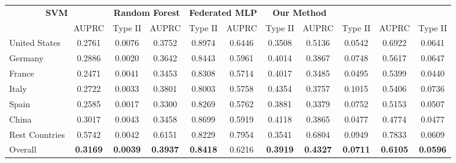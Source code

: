 \begin{table}[ht!]
{\begin{tabular}{l|cc|cc|cc|cc|cc}
\multicolumn{2}{c|}{\textbf{SVM}} &
\multicolumn{2}{c|}{\textbf{Random Forest}} &
\multicolumn{2}{c|}{\textbf{Federated MLP}} &
\multicolumn{2}{c}{\textbf{Our Method}} \\
& AUPRC  & Type II & AUPRC  & Type II & AUPRC  & Type II & AUPRC  & Type II & AUPRC  & Type II \\
\hline
United States   & 0.2761 & 0.0076 & 0.3752 & 0.8974 & 0.6446 & 0.3508 & 0.5136 & 0.0542 & 0.6922 & 0.0641 \\
Germany         & 0.2886 & 0.0020 & 0.3642 & 0.8443 & 0.5961 & 0.4014 & 0.3867 & 0.0748 & 0.5617 & 0.0647 \\
France          & 0.2471 & 0.0041 & 0.3453 & 0.8308 & 0.5714 & 0.4017 & 0.3485 & 0.0495 & 0.5399 & 0.0440 \\
Italy           & 0.2722 & 0.0033 & 0.3801 & 0.8003 & 0.5758 & 0.4354 & 0.3757 & 0.1015 & 0.5406 & 0.0736 \\
Spain           & 0.2585 & 0.0017 & 0.3300 & 0.8269 & 0.5762 & 0.3881 & 0.3379 & 0.0752 & 0.5153 & 0.0507 \\
China           & 0.3017 & 0.0043 & 0.3458 & 0.8699 & 0.5919 & 0.4118 & 0.3865 & 0.0477 & 0.4774 & 0.0477 \\
Rest Countries  & 0.5742 & 0.0042 & 0.6151 & 0.8229 & 0.7954 & 0.3541 & 0.6804 & 0.0949 & 0.7833 & 0.0609 \\
\hline
Overall         & \textbf{0.3169} & \textbf{0.0039} & \textbf{0.3937} & \textbf{0.8418} & 0.6216 & \textbf{0.3919} & \textbf{0.4327} & \textbf{0.0711} & \textbf{0.6105} & \textbf{0.0596} \\
\hline
\end{tabular}}
\label{subpopulation_shift_results}
\end{table}

